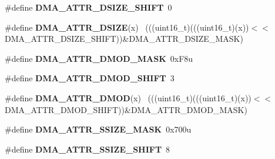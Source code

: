 \begin{DoxyCompactItemize}
\item 
\hypertarget{group___d_m_a___register___masks_ga24d7778d89bba4e048649cfa85bbc2d3}{}\#define {\bfseries D\+M\+A\+\_\+\+A\+T\+T\+R\+\_\+\+D\+S\+I\+Z\+E\+\_\+\+S\+H\+I\+F\+T}~0\label{group___d_m_a___register___masks_ga24d7778d89bba4e048649cfa85bbc2d3}

\item 
\hypertarget{group___d_m_a___register___masks_ga194838e6c930b528ed1309d70a69ed8b}{}\#define {\bfseries D\+M\+A\+\_\+\+A\+T\+T\+R\+\_\+\+D\+S\+I\+Z\+E}(x)                                            ~(((uint16\+\_\+t)(((uint16\+\_\+t)(x))$<$$<$D\+M\+A\+\_\+\+A\+T\+T\+R\+\_\+\+D\+S\+I\+Z\+E\+\_\+\+S\+H\+I\+F\+T))\&D\+M\+A\+\_\+\+A\+T\+T\+R\+\_\+\+D\+S\+I\+Z\+E\+\_\+\+M\+A\+S\+K)\label{group___d_m_a___register___masks_ga194838e6c930b528ed1309d70a69ed8b}

\item 
\hypertarget{group___d_m_a___register___masks_gaaa09f9ea822cc0cfe20270611cf522cc}{}\#define {\bfseries D\+M\+A\+\_\+\+A\+T\+T\+R\+\_\+\+D\+M\+O\+D\+\_\+\+M\+A\+S\+K}~0x\+F8u\label{group___d_m_a___register___masks_gaaa09f9ea822cc0cfe20270611cf522cc}

\item 
\hypertarget{group___d_m_a___register___masks_gab9f08d507f579493d605780d854404d6}{}\#define {\bfseries D\+M\+A\+\_\+\+A\+T\+T\+R\+\_\+\+D\+M\+O\+D\+\_\+\+S\+H\+I\+F\+T}~3\label{group___d_m_a___register___masks_gab9f08d507f579493d605780d854404d6}

\item 
\hypertarget{group___d_m_a___register___masks_ga8dbf246216f082cd9cdce28d9d7c29c1}{}\#define {\bfseries D\+M\+A\+\_\+\+A\+T\+T\+R\+\_\+\+D\+M\+O\+D}(x)                                              ~(((uint16\+\_\+t)(((uint16\+\_\+t)(x))$<$$<$D\+M\+A\+\_\+\+A\+T\+T\+R\+\_\+\+D\+M\+O\+D\+\_\+\+S\+H\+I\+F\+T))\&D\+M\+A\+\_\+\+A\+T\+T\+R\+\_\+\+D\+M\+O\+D\+\_\+\+M\+A\+S\+K)\label{group___d_m_a___register___masks_ga8dbf246216f082cd9cdce28d9d7c29c1}

\item 
\hypertarget{group___d_m_a___register___masks_ga30f2f09fb581b8c9619414125cf3045b}{}\#define {\bfseries D\+M\+A\+\_\+\+A\+T\+T\+R\+\_\+\+S\+S\+I\+Z\+E\+\_\+\+M\+A\+S\+K}~0x700u\label{group___d_m_a___register___masks_ga30f2f09fb581b8c9619414125cf3045b}

\item 
\hypertarget{group___d_m_a___register___masks_ga815c285ac74667a99f2a7ce5e686641b}{}\#define {\bfseries D\+M\+A\+\_\+\+A\+T\+T\+R\+\_\+\+S\+S\+I\+Z\+E\+\_\+\+S\+H\+I\+F\+T}~8\label{group___d_m_a___register___masks_ga815c285ac74667a99f2a7ce5e686641b}


\end{DoxyCompactItemize}
